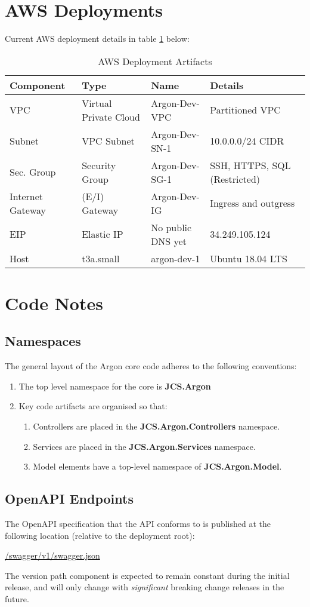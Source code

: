 \documentclass{book}
\begin{document}
\section{AWS Deployments}
Current AWS deployment details in table \ref{table:2} below:
\begin{table}[h!]
    \centering
    \begin{tabular}{|| l | l | l | l ||}
        \hline 
        \textbf{Component} & \textbf{Type} & \textbf{Name} & \textbf{Details} \\
        \hline
        VPC & Virtual Private Cloud & Argon-Dev-VPC & Partitioned VPC \\
        Subnet & VPC Subnet & Argon-Dev-SN-1 & 10.0.0.0/24 CIDR \\
        Sec. Group & Security Group & Argon-Dev-SG-1 & SSH, HTTPS, SQL (Restricted) \\
        Internet Gateway & (E/I) Gateway & Argon-Dev-IG & Ingress and outgress \\
        EIP & Elastic IP & No public DNS yet & 34.249.105.124 \\
        Host & t3a.small & argon-dev-1 & Ubuntu 18.04 LTS \\
        \hline
    \end{tabular}
    \caption{AWS Deployment Artifacts}
    \label{table:2}
\end{table}   

\section{Code Notes}
\subsection{Namespaces}
The general layout of the Argon core code adheres to the following conventions:
\begin{enumerate}
    \item The top level namespace for the core is \textbf{JCS.Argon}
    \item Key code artifacts are organised so that:
    \begin{enumerate}
        \item Controllers are placed in the \textbf{JCS.Argon.Controllers} namespace.
        \item Services are placed in the \textbf{JCS.Argon.Services} namespace.
        \item Model elements have a top-level namespace of \textbf{JCS.Argon.Model}.
    \end{enumerate}
\end{enumerate}
\subsection{OpenAPI Endpoints}
The OpenAPI specification that the API conforms to is published at the following location (relative to the deployment root):
\begin{center}
    \url{/swagger/v1/swagger.json}
\end{center}
The version path component is expected to remain constant during the initial release, and will only change with \textit{significant} breaking change releases in the future.
\end{document}
